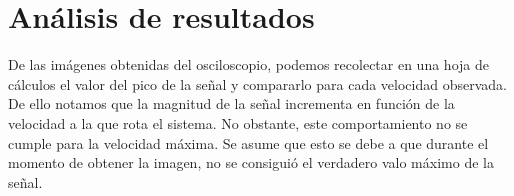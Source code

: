 \section{An\'alisis de resultados}
De las im\'agenes obtenidas del osciloscopio, podemos
recolectar en una hoja de c\'alculos el valor del pico de
la se\~nal y compararlo para cada velocidad observada.
De ello notamos que la magnitud de la se\~nal incrementa
en funci\'on de la velocidad a la que rota el sistema.
No obstante, este comportamiento no se cumple para la
velocidad m\'axima. Se asume que esto se debe a que durante
el momento de obtener la imagen, no se consigui\'o el
verdadero valo m\'aximo de la se\~nal.